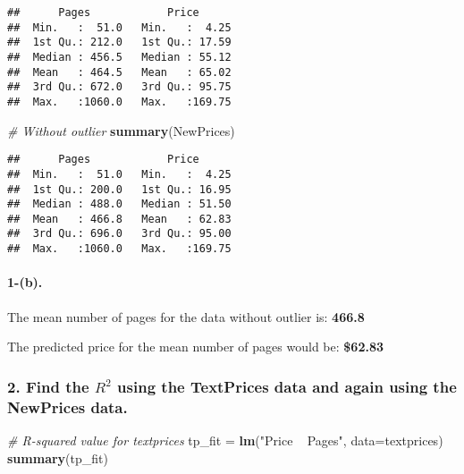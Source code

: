\documentclass[]{article}
\newenvironment{Shaded}{\begin{snugshade}}{\end{snugshade}}
\newcommand{\KeywordTok}[1]{\textcolor[rgb]{0.13,0.29,0.53}{\textbf{{#1}}}}
\newcommand{\DataTypeTok}[1]{\textcolor[rgb]{0.13,0.29,0.53}{{#1}}}
\newcommand{\StringTok}[1]{\textcolor[rgb]{0.31,0.60,0.02}{{#1}}}
\newcommand{\CommentTok}[1]{\textcolor[rgb]{0.56,0.35,0.01}{\textit{{#1}}}}
\newcommand{\NormalTok}[1]{{#1}}
\let\oldparagraph\paragraph
\renewcommand{\paragraph}[1]{\oldparagraph{#1}\mbox{}}
\begin{document}
\begin{verbatim}
##      Pages            Price       
##  Min.   :  51.0   Min.   :  4.25  
##  1st Qu.: 212.0   1st Qu.: 17.59  
##  Median : 456.5   Median : 55.12  
##  Mean   : 464.5   Mean   : 65.02  
##  3rd Qu.: 672.0   3rd Qu.: 95.75  
##  Max.   :1060.0   Max.   :169.75
\end{verbatim}

\begin{Shaded}
\begin{Highlighting}[]
\CommentTok{# Without outlier}
\KeywordTok{summary}\NormalTok{(NewPrices)}
\end{Highlighting}
\end{Shaded}

\begin{verbatim}
##      Pages            Price       
##  Min.   :  51.0   Min.   :  4.25  
##  1st Qu.: 200.0   1st Qu.: 16.95  
##  Median : 488.0   Median : 51.50  
##  Mean   : 466.8   Mean   : 62.83  
##  3rd Qu.: 696.0   3rd Qu.: 95.00  
##  Max.   :1060.0   Max.   :169.75
\end{verbatim}

\paragraph{1-(b).}\label{b.}

The mean number of pages for the data without outlier is: \textbf{466.8}

The predicted price for the mean number of pages would be:
\textbf{\$62.83}

\subsubsection{\texorpdfstring{2. Find the \(R^2\) using the TextPrices
data and again using the NewPrices
data.}{2. Find the R\^{}2 using the TextPrices data and again using the NewPrices data.}}\label{find-the-r2-using-the-textprices-data-and-again-using-the-newprices-data.}

\begin{Shaded}
\begin{Highlighting}[]
\CommentTok{# R-squared value for textprices}
\NormalTok{tp_fit =}\StringTok{ }\KeywordTok{lm}\NormalTok{(}\StringTok{"Price ~ Pages"}\NormalTok{, }\DataTypeTok{data=}\NormalTok{textprices)}
\KeywordTok{summary}\NormalTok{(tp_fit)}
\end{Highlighting}
\end{Shaded}
\end{document}
